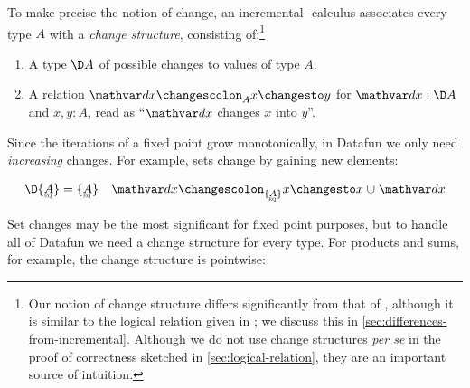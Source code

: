 To make precise the notion of change, an incremental \fn-calculus associates
every type $A$ with a \emph{change structure}, consisting of:\footnote{Our
  notion of change structure differs significantly from that of
  \citet{incremental}, although it is similar to the logical relation given in
  \citet{DBLP:conf/esop/GiarrussoRS19}; we discuss this in
  \cref{sec:differences-from-incremental}. Although we do not use change
  structures \emph{per se} in the proof of correctness sketched in \cref{sec:logical-relation}, they are an important source of
  intuition.}

\begin{enumerate}
\item A type $\D A$ of possible changes to values of type $A$.
\item A relation $\changesat{A}{\dx}{x}{y}$ for $\dx : \D A$ and $x,y : A$,
  read as ``$\dx$ changes $x$ into $y$''.
\end{enumerate}

\noindent
Since the iterations of a fixed point grow monotonically, in Datafun we only
need \emph{increasing} changes.
%
For example, sets change by gaining new elements:

\begin{align*}
  \D\tseteq{A} &= \tseteq{A}
  &
  \changesat{\tseteq{A}}{\dx}{x}{x \cup \dx}
\end{align*}

Set changes may be the most significant for fixed point purposes, but to handle
all of Datafun we need a change structure for every type. For products and sums,
for example, the change structure is pointwise:


